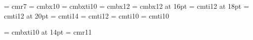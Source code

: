 




\font\small         = cmr7
\font\sxmplbx       = cmbx10 
\font\sxmplbxti     = cmbxti10 
\font\xmplbx        = cmbx12 %
\font\mxmplbx       = cmbx12 at 16pt
\font\bxmplbx       = cmti12 at 18pt %
\font\bxmplbxt      = cmti12 at 20pt %
\font\chap          = cmti14
\font\chapcont      = cmti12
\font\sectioncont   = cmti10
\font\header        = cmti10



\font\xmplbxti  = cmbxti10 at 14pt
\font\bookfont  = cmr11


\newdimen\leftfigureskip \leftfigureskip=10pc
\newdimen\rightfigureskip \rightfigureskip=5pc

\def\pal{\def\rm{\fam0 \tenrm}%
   \def\it{\fam\itfam \tenit}%
   \def\bf{\fam\bffam \tenbf}%
   \def\tt{\fam\ttfam \tentt}%
   \let\mit=\teni
   \let\mex=\tenx
   \rm
   }%

\newwrite\tocfile 

\newwrite\indexfile 

